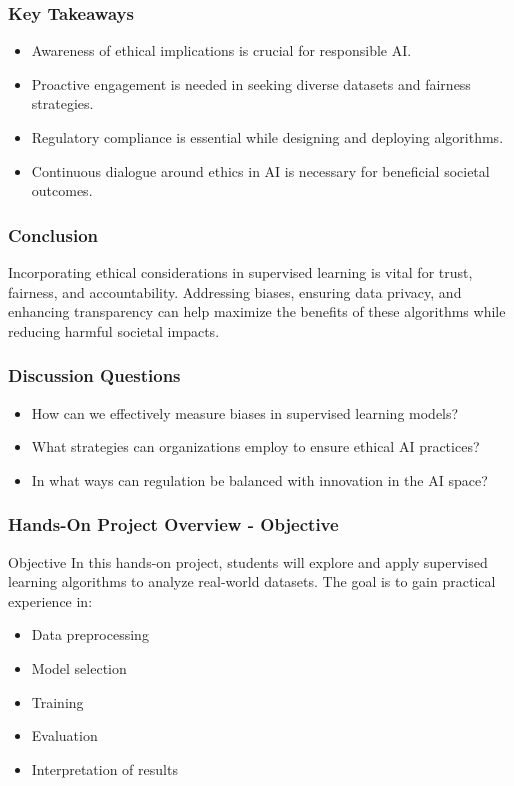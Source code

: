 \documentclass[aspectratio=169]{beamer}
\begin{document}
\begin{frame}[fragile]
    \frametitle{Key Takeaways}
    \begin{itemize}
        \item Awareness of ethical implications is crucial for responsible AI.
        \item Proactive engagement is needed in seeking diverse datasets and fairness strategies.
        \item Regulatory compliance is essential while designing and deploying algorithms.
        \item Continuous dialogue around ethics in AI is necessary for beneficial societal outcomes.
    \end{itemize}
\end{frame}

\begin{frame}[fragile]
    \frametitle{Conclusion}
    Incorporating ethical considerations in supervised learning is vital for trust, fairness, and accountability. Addressing biases, ensuring data privacy, and enhancing transparency can help maximize the benefits of these algorithms while reducing harmful societal impacts.
\end{frame}

\begin{frame}[fragile]
    \frametitle{Discussion Questions}
    \begin{itemize}
        \item How can we effectively measure biases in supervised learning models?
        \item What strategies can organizations employ to ensure ethical AI practices?
        \item In what ways can regulation be balanced with innovation in the AI space?
    \end{itemize}
\end{frame}

\begin{frame}[fragile]
    \frametitle{Hands-On Project Overview - Objective}
    \begin{block}{Objective}
        In this hands-on project, students will explore and apply supervised learning algorithms to analyze real-world datasets. 
        The goal is to gain practical experience in:
        \begin{itemize}
            \item Data preprocessing
            \item Model selection
            \item Training
            \item Evaluation
            \item Interpretation of results
        \end{itemize}
    \end{block}
\end{frame}
\end{document}
